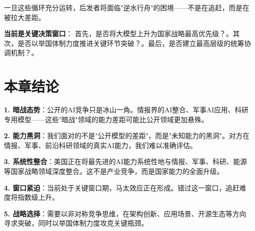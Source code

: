 一旦这些循环充分运转，后发者将面临"逆水行舟"的困境——不是在追赶，而是在被拉大差距。

\textbf{当前是关键决策窗口}：
首先，是否将大模型上升为国家战略最高优先级？。其次，是否以举国体制力度推进关键环节突破？。最后，是否建立最高层级的统筹协调机制？。

\section{本章结论}

\textbf{1. 暗战态势}：公开的AI竞争只是冰山一角。情报界的AI整合、军事AI应用、科研专用模型——这些"暗战"领域的能力差距可能比公开领域更加悬殊。

\textbf{2. 能力黑洞}：我们面对的不是"公开模型的差距"，而是"未知能力的黑洞"。对方在情报、军事、前沿科研领域的真实AI能力，我们难以准确评估。

\textbf{3. 系统性整合}：美国正在将最先进的AI能力系统性地与情报、军事、科研、能源等国家战略领域深度整合。这不是产业竞争，而是国家能力的全面升级。

\textbf{4. 窗口紧迫}：当前处于关键窗口期，马太效应正在形成。错过这一窗口，追赶难度将指数级上升。

\textbf{5. 战略选择}：需要以非对称竞争思维，在架构创新、应用场景、开源生态等方向寻求突破，同时以举国体制力度攻克关键瓶颈。

